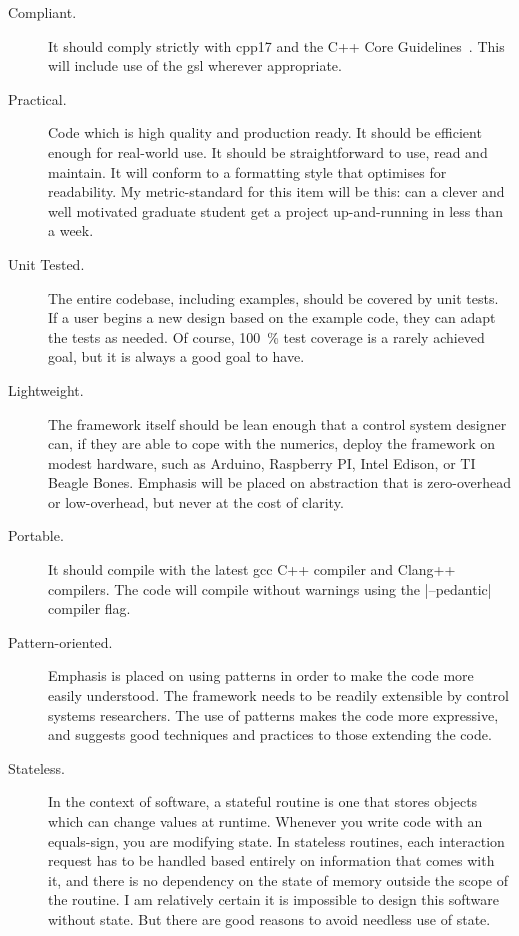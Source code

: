 \begin{description}
  \item[Compliant.] It should comply strictly with \acl{cpp17} and the C++ Core
  Guidelines~\cite{CppCoreGuidelines}. This will include
  use of the \ac{gsl} wherever appropriate.
  \item[Practical.] Code which is high quality and production ready. It should
  be efficient enough for real-world use. It should be straightforward to use,
  read and maintain. It will conform to a formatting style that optimises for
  readability. My metric-standard for this item will be this: can a clever and
  well motivated graduate student get a project up-and-running in less than a
  week.
  \item[Unit Tested.] The entire codebase, including examples, should be covered
  by unit tests. If a user begins a new design based on the example code, they
  can adapt the tests as needed. Of course, \SI{100}{\percent} test coverage is
  a rarely achieved goal, but it is always a good goal to have.
  \item[Lightweight.] The framework itself should be lean enough that a control
  system designer can, if they are able to cope with the numerics, deploy the
  framework on modest hardware, such as Arduino, Raspberry PI, Intel Edison, or
  TI Beagle Bones. Emphasis will be placed on abstraction that is zero-overhead
  or low-overhead, but never at the cost of clarity.
  \item[Portable.] It should compile with the latest \ac{gcc} C++ compiler and
  Clang++ compilers. The code will compile without warnings using the
  |--pedantic| compiler flag.
  \item[Pattern-oriented.] Emphasis is placed on using patterns in order to make
  the code more easily understood. The framework needs to be readily extensible
  by control systems researchers. The use of patterns makes the code more
  expressive, and suggests good techniques and practices to those extending the
  code.
  \item[Stateless.] In the context of software, a stateful routine is one that
  stores objects which can change values at runtime. Whenever you write code
  with an equals-sign, you are modifying state. In stateless routines, each
  interaction request has to be handled based entirely on information that comes
  with it, and there is no dependency on the state of memory outside the scope
  of the routine. I am relatively certain it is impossible to design this
  software without state. But there are good reasons to avoid needless use of
  state.


\end{description}

